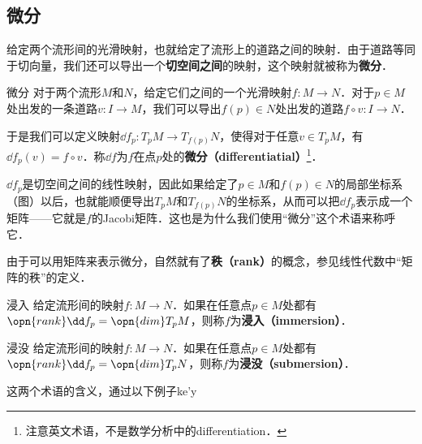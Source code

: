 


\subsection{微分}

给定两个流形间的光滑映射，也就给定了流形上的道路之间的映射．由于道路等同于切向量，我们还可以导出一个\textbf{切空间之间}的映射，这个映射就被称为\textbf{微分}．

\begin{definition}{微分}
对于两个流形$M$和$N$，给定它们之间的一个光滑映射$f:M\to N$．对于$p\in M$处出发的一条道路$v:I\to M$，我们可以导出$f(p)\in N$处出发的道路$f\circ v:I\to N$．

于是我们可以定义映射$\dd f_p: T_pM\to T_{f(p)}N$，使得对于任意$v\in T_pM$，有$\dd f_p(v)=f\circ v$．称$\dd f$为$f$在点$p$处的\textbf{微分（differentiatial）}\footnote{注意英文术语，不是数学分析中的differentiation．}．
\end{definition}

$\dd f_p$是切空间之间的线性映射，因此如果给定了$p\in M$和$f(p)\in N$的局部坐标系（图）以后，也就能顺便导出$T_pM$和$T_{f(p)}N$的坐标系，从而可以把$\dd f_p$表示成一个矩阵——它就是$f$的Jacobi矩阵．这也是为什么我们使用“微分”这个术语来称呼它．

由于可以用矩阵来表示微分，自然就有了\textbf{秩（rank）}的概念，参见线性代数中“矩阵的秩”的定义．

\begin{definition}{浸入}
给定流形间的映射$f:M\to N$．如果在任意点$p\in M$处都有$\opn{rank}\dd f_p=\opn{dim}T_pM$，则称$f$为\textbf{浸入（immersion）}．
\end{definition}

\begin{definition}{浸没}
给定流形间的映射$f:M\to N$．如果在任意点$p\in M$处都有$\opn{rank}\dd f_p=\opn{dim}T_pN$，则称$f$为\textbf{浸没（submersion）}．
\end{definition}

这两个术语的含义，通过以下例子ke'y

















